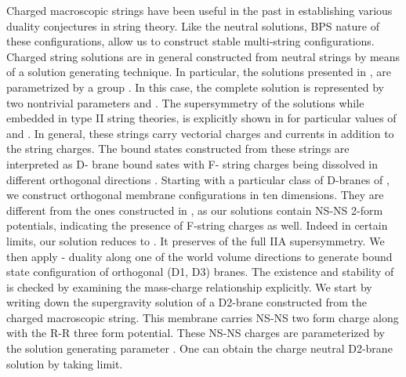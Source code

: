 \documentclass[a4paper,12pt,fleqn,cite,epsfig]{article}
\begin{document}
Charged macroscopic strings have been useful in the past in establishing
various duality conjectures in string theory. Like the neutral
solutions, BPS nature of these configurations, allow us to construct stable
multi-string configurations. Charged string solutions are in general 
constructed from neutral strings by means of a solution generating
technique. In particular, the solutions presented in \cite{sen},
are parametrized by a group \coordHE{}. In this case, the complete solution 
is represented by two nontrivial parameters \myHighlight{$\alpha$}\coordHE{} and \myHighlight{$\beta$}\coordHE{}.
The supersymmetry of the solutions while embedded in type II string 
theories, is explicitly shown in \cite{kumar} for particular values of
\myHighlight{$\alpha$}\coordHE{} and \myHighlight{$\beta$}\coordHE{}.
In general, these strings carry vectorial charges and currents
in addition to the string charges. The bound states constructed 
from these strings are interpreted as D- brane bound sates with
F- string charges being dissolved in different orthogonal 
directions \cite{kamal}.  
Starting with a particular class of D-branes of \cite{kamal}, we construct 
orthogonal membrane configurations in ten dimensions. They are
different from the ones constructed in \cite{myers1,hambli}, 
as our solutions contain NS-NS
2-form potentials, indicating the presence of F-string charges as well. 
Indeed in certain limits, our solution reduces to
\cite{myers1,hambli}. It preserves \coordHE{} of the full IIA supersymmetry.
We then apply \coordHE{}- duality along one of the world volume directions to
generate bound state configuration of orthogonal (D1, D3) branes.
The existence and stability of \coordHE{} is checked by
examining the mass-charge relationship explicitly.
We start by writing down the supergravity solution of a D2-brane
constructed from the charged macroscopic string\cite{kamal}. 
This membrane carries NS-NS two form charge along with the R-R 
three form potential. 
These NS-NS charges are parameterized by the 
solution generating parameter \myHighlight{$\alpha$}\coordHE{}. One can obtain the 
charge neutral D2-brane solution\cite{kastor,duff} by taking \coordHE{}
limit.  
\end{document}
